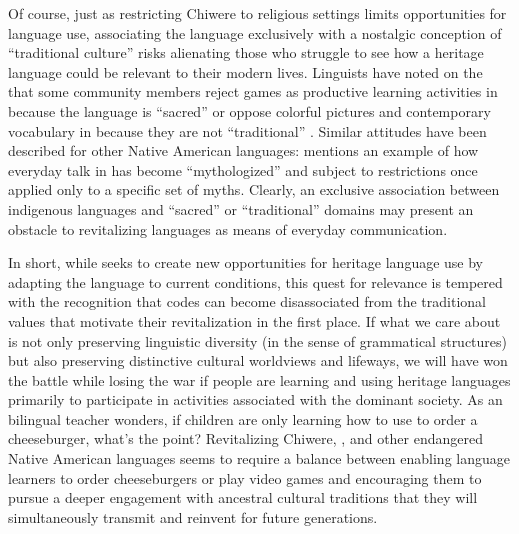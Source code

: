 \documentclass[output=paper]{LSP/langsci}
\begin{document}
Of course, just as restricting Chiwere to religious settings limits opportunities for language use, associating the language exclusively with a nostalgic conception of ``traditional culture'' risks alienating those who struggle to see how a heritage language could be relevant to their modern lives. Linguists have noted on the  that some community members reject games as productive learning activities in  because the language is ``sacred'' or oppose colorful pictures and contemporary vocabulary in  because they are not ``traditional'' \citep{deReuse2014b, Ullrich2014a, Ullrich2014b}. Similar attitudes have been described for other Native American languages:  mentions an example of how everyday talk in  has become ``mythologized'' and subject to restrictions once applied only to a specific set of myths. Clearly, an exclusive association between indigenous languages and ``sacred'' or ``traditional'' domains may present an obstacle to revitalizing languages as means of everyday communication.

In short, while  seeks to create new opportunities for heritage language use by adapting the language to current conditions, this quest for relevance is tempered with the recognition that codes can become disassociated from the traditional values that motivate their revitalization in the first place. If what we care about is not only preserving linguistic diversity (in the sense of grammatical structures) but also preserving distinctive cultural worldviews and lifeways, we will have won the battle while losing the war if people are learning and using heritage languages primarily to participate in activities associated with the dominant society. As an  bilingual teacher wonders, if children are only learning how to use  to order a cheeseburger, what's the point? \citep[551]{Samuels2006} Revitalizing Chiwere, , and other endangered Native American languages seems to require a balance between enabling language learners to order cheeseburgers or play video games and encouraging them to pursue a deeper engagement with ancestral cultural traditions that they will simultaneously transmit and reinvent for future generations.
\end{document}
